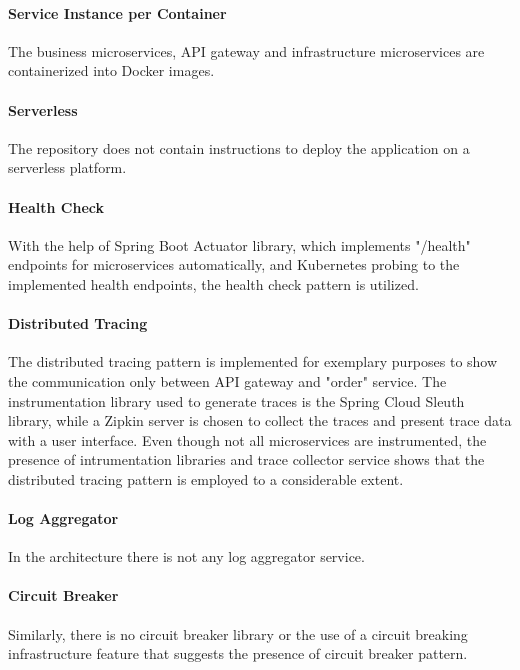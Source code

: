 \documentclass{Configuration_Files/PoliMi3i_thesis}
\begin{document}
\paragraph{Service Instance per Container} The business microservices, API gateway and infrastructure microservices are containerized into Docker images.

\paragraph{Serverless} The repository does not contain instructions to deploy the application on a serverless platform.

\paragraph{Health Check} With the help of Spring Boot Actuator library, which implements "/health" endpoints for microservices automatically, and Kubernetes probing to the implemented health endpoints, the health check pattern is utilized.

\paragraph{Distributed Tracing} The distributed tracing pattern is implemented for exemplary purposes to show the communication only between API gateway and "order" service.
The instrumentation library used to generate traces is the Spring Cloud Sleuth\footnotemark[93] library, while a Zipkin server is chosen to collect the traces and present trace data with a user interface.
Even though not all microservices are instrumented, the presence of intrumentation libraries and trace collector service shows that the distributed tracing pattern is employed to a considerable extent.

\paragraph{Log Aggregator} In the architecture there is not any log aggregator service.

\paragraph{Circuit Breaker} Similarly, there is no circuit breaker library or the use of a circuit breaking infrastructure feature that suggests the presence of circuit breaker pattern.
\end{document}
